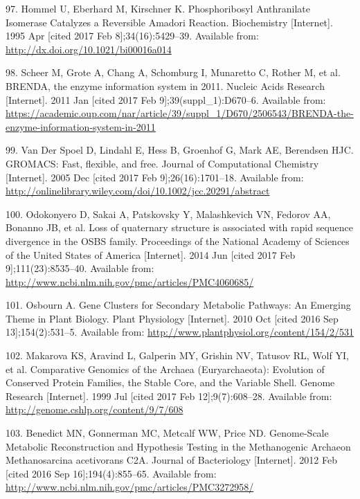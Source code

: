 \documentclass[12pt,twoside]{reedthesis}
\begin{document}
  \hypertarget{ref-hommel_phosphoribosyl_1995}{}
  97. Hommel U, Eberhard M, Kirschner K. Phosphoribosyl Anthranilate
  Isomerase Catalyzes a Reversible Amadori Reaction. Biochemistry
  {[}Internet{]}. 1995 Apr {[}cited 2017 Feb 8{]};34(16):5429--39.
  Available from: \url{http://dx.doi.org/10.1021/bi00016a014}
  
  \hypertarget{ref-scheer_brenda_2011}{}
  98. Scheer M, Grote A, Chang A, Schomburg I, Munaretto C, Rother M, et
  al. BRENDA, the enzyme information system in 2011. Nucleic Acids
  Research {[}Internet{]}. 2011 Jan {[}cited 2017 Feb
  9{]};39(suppl\_1):D670--6. Available from:
  \url{https://academic.oup.com/nar/article/39/suppl_1/D670/2506543/BRENDA-the-enzyme-information-system-in-2011}
  
  \hypertarget{ref-van_der_spoel_gromacs_2005}{}
  99. Van Der Spoel D, Lindahl E, Hess B, Groenhof G, Mark AE, Berendsen
  HJC. GROMACS: Fast, flexible, and free. Journal of Computational
  Chemistry {[}Internet{]}. 2005 Dec {[}cited 2017 Feb
  9{]};26(16):1701--18. Available from:
  \url{http://onlinelibrary.wiley.com/doi/10.1002/jcc.20291/abstract}
  
  \hypertarget{ref-odokonyero_loss_2014}{}
  100. Odokonyero D, Sakai A, Patskovsky Y, Malashkevich VN, Fedorov AA,
  Bonanno JB, et al. Loss of quaternary structure is associated with rapid
  sequence divergence in the OSBS family. Proceedings of the National
  Academy of Sciences of the United States of America {[}Internet{]}. 2014
  Jun {[}cited 2017 Feb 9{]};111(23):8535--40. Available from:
  \url{http://www.ncbi.nlm.nih.gov/pmc/articles/PMC4060685/}
  
  \hypertarget{ref-osbourn_gene_2010}{}
  101. Osbourn A. Gene Clusters for Secondary Metabolic Pathways: An
  Emerging Theme in Plant Biology. Plant Physiology {[}Internet{]}. 2010
  Oct {[}cited 2016 Sep 13{]};154(2):531--5. Available from:
  \url{http://www.plantphysiol.org/content/154/2/531}
  
  \hypertarget{ref-makarova_comparative_1999}{}
  102. Makarova KS, Aravind L, Galperin MY, Grishin NV, Tatusov RL, Wolf
  YI, et al. Comparative Genomics of the Archaea (Euryarchaeota):
  Evolution of Conserved Protein Families, the Stable Core, and the
  Variable Shell. Genome Research {[}Internet{]}. 1999 Jul {[}cited 2017
  Feb 12{]};9(7):608--28. Available from:
  \url{http://genome.cshlp.org/content/9/7/608}
  
  \hypertarget{ref-benedict_genome-scale_2012}{}
  103. Benedict MN, Gonnerman MC, Metcalf WW, Price ND. Genome-Scale
  Metabolic Reconstruction and Hypothesis Testing in the Methanogenic
  Archaeon Methanosarcina acetivorans C2A. Journal of Bacteriology
  {[}Internet{]}. 2012 Feb {[}cited 2016 Sep 16{]};194(4):855--65.
  Available from:
  \url{http://www.ncbi.nlm.nih.gov/pmc/articles/PMC3272958/}
  
\end{document}
